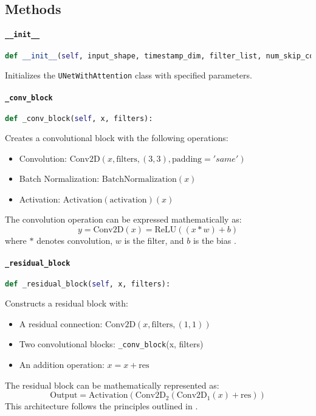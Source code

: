 \documentclass{article}
\begin{document}
	\subsection{Methods}
	
	\paragraph{\texttt{\_\_init\_\_}}
	\begin{lstlisting}[language=Python]
		def __init__(self, input_shape, timestamp_dim, filter_list, num_skip_connections, num_heads=4, key_dim=64, use_bias=False, activation='swish'):
	\end{lstlisting}
	Initializes the \texttt{UNetWithAttention} class with specified parameters.
	
	\paragraph{\texttt{\_conv\_block}}
	\begin{lstlisting}[language=Python]
		def _conv_block(self, x, filters):
	\end{lstlisting}
	Creates a convolutional block with the following operations:
	\begin{itemize}
		\item Convolution: \( \text{Conv2D}(x, \text{filters}, (3, 3), \text{padding}='same') \)
		\item Batch Normalization: \( \text{BatchNormalization}(x) \)
		\item Activation: \( \text{Activation}(\text{activation})(x) \)
	\end{itemize}
	The convolution operation can be expressed mathematically as:
	\[
	y = \text{Conv2D}(x) = \text{ReLU}((x * w) + b)
	\]
	where \( * \) denotes convolution, \( w \) is the filter, and \( b \) is the bias \cite{lecun1998gradient}.
	
	\paragraph{\texttt{\_residual\_block}}
	\begin{lstlisting}[language=Python]
		def _residual_block(self, x, filters):
	\end{lstlisting}
	Constructs a residual block with:
	\begin{itemize}
		\item A residual connection: \( \text{Conv2D}(x, \text{filters}, (1, 1)) \)
		\item Two convolutional blocks: \texttt{\_conv\_block}(x, filters)
		\item An addition operation: \( x = x + \text{res} \)
	\end{itemize}
	The residual block can be mathematically represented as:
	\[
	\text{Output} = \text{Activation}(\text{Conv2D}_2(\text{Conv2D}_1(x) + \text{res}))
	\]
	This architecture follows the principles outlined in \cite{he2016deep}.
	
\end{document}
